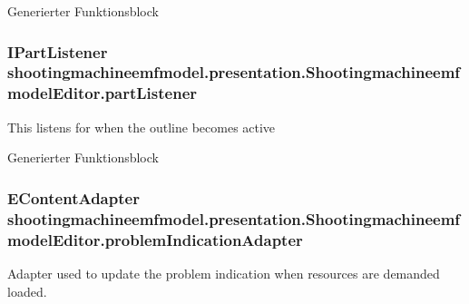Generierter Funktionsblock \hypertarget{classshootingmachineemfmodel_1_1presentation_1_1_shootingmachineemfmodel_editor_a30c956da01f649d6d98c017db4b1672b}{
\subsubsection[{part\-Listener}]{\setlength{\rightskip}{0pt plus 5cm}I\-Part\-Listener shootingmachineemfmodel.\-presentation.\-Shootingmachineemfmodel\-Editor.\-part\-Listener\hspace{0.3cm}{\ttfamily [protected]}}}\label{classshootingmachineemfmodel_1_1presentation_1_1_shootingmachineemfmodel_editor_a30c956da01f649d6d98c017db4b1672b}
This listens for when the outline becomes active

Generierter Funktionsblock \hypertarget{classshootingmachineemfmodel_1_1presentation_1_1_shootingmachineemfmodel_editor_a43238bbf2209ac50a389d7955a41dc9a}{
\subsubsection[{problem\-Indication\-Adapter}]{\setlength{\rightskip}{0pt plus 5cm}E\-Content\-Adapter shootingmachineemfmodel.\-presentation.\-Shootingmachineemfmodel\-Editor.\-problem\-Indication\-Adapter\hspace{0.3cm}{\ttfamily [protected]}}}\label{classshootingmachineemfmodel_1_1presentation_1_1_shootingmachineemfmodel_editor_a43238bbf2209ac50a389d7955a41dc9a}
Adapter used to update the problem indication when resources are demanded loaded.

